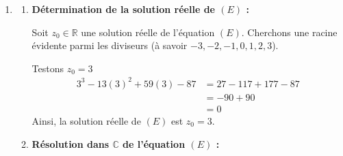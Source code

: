 \documentclass[12pt,a4paper]{article}
\begin{document}
\begin{enumerate}
    \item 
    \begin{enumerate}
        \item \textbf{Détermination de la solution réelle de $(E)$ :}
        
        Soit $z_0 \in \mathbb{R}$ une solution réelle de l'équation $(E)$. Cherchons une racine évidente parmi les diviseurs (à savoir $-3, -2, -1, 0, 1, 2, 3$).
        
        Testons $z_0 = 3$ 
        $$
        \begin{aligned}
            3^3 - 13(3)^2 + 59(3) - 87 &= 27 - 117 + 177 - 87 \\
            &= -90 + 90 \\
            &= 0
        \end{aligned}
        $$
        Ainsi, la solution réelle de $(E)$ est $z_0 = 3$.

        \item \textbf{Résolution dans $\mathbb{C}$ de l'équation $(E)$ :}
        

\end{enumerate}
\end{enumerate}
\end{document}
